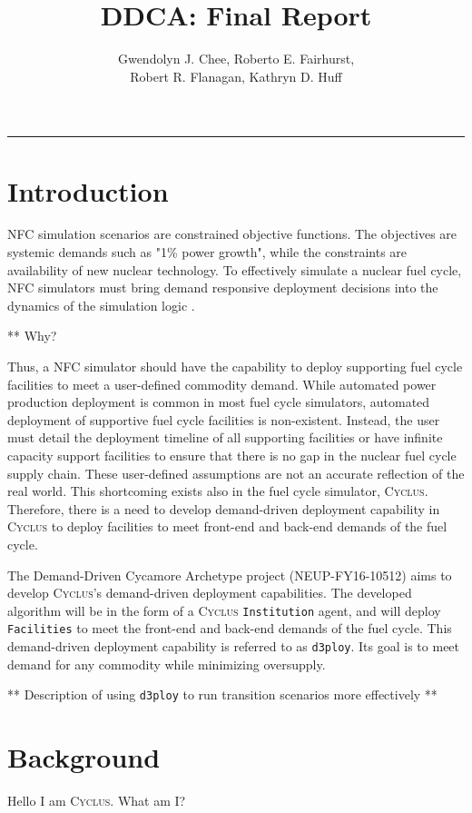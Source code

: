 \documentclass[11pt,letterpaper]{article}
\title{DDCA: Final Report}
\author{Gwendolyn J. Chee, Roberto E. Fairhurst, 
\\ \vspace{0.5em} Robert R. Flanagan, Kathryn D. Huff}
\newcommand{\Cyclus}{\textsc{Cyclus}\xspace}%
\newcommand{\deploy}{\texttt{d3ploy}\xspace}%
\begin{document}
	\maketitle
	\hrule

\section{Introduction}
\gls{NFC} simulation scenarios are constrained objective functions. 
The objectives are systemic demands such as "1\% power growth", 
while the constraints are availability of new nuclear technology.
To effectively simulate a nuclear fuel cycle, \gls{NFC} simulators 
must bring demand responsive deployment decisions into the dynamics
of the simulation logic \cite{huff_current_2017}.

** Why? 

Thus, a \gls{NFC} simulator should have the capability to deploy 
supporting fuel cycle facilities to meet a user-defined commodity
demand. 
While automated power production deployment is common in most fuel
cycle simulators, automated deployment of supportive fuel cycle 
facilities is non-existent. 
Instead, the user must detail the deployment timeline of all 
supporting facilities or have infinite capacity support facilities
to ensure that there is no gap in the nuclear fuel cycle supply 
chain. 
These user-defined assumptions are not an accurate reflection 
of the real world. 
This shortcoming exists also in the fuel cycle simulator, \Cyclus. 
Therefore, there is a need to develop demand-driven deployment 
capability in \Cyclus to deploy facilities to meet front-end and 
back-end demands of the fuel cycle.

The Demand-Driven Cycamore Archetype project (NEUP-FY16-10512) 
aims to develop \Cyclus's demand-driven deployment capabilities. 
The developed algorithm will be in the form of a \Cyclus 
\texttt{Institution} agent, and will deploy \texttt{Facilities} 
to meet the front-end and back-end demands of the fuel cycle.
This demand-driven deployment capability is referred to as 
\deploy. 
Its goal is to meet demand for any commodity while minimizing 
oversupply. 

** Description of using \deploy to run transition scenarios more effectively ** 

\section{Background}
Hello I am \Cyclus. What am I? 
\end{document}
